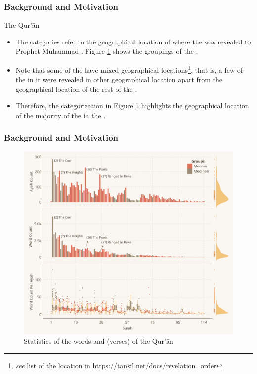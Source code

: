 \documentclass{beamer}
\theoremstyle{definition}
\begin{document}
\begin{frame}[t, fragile]\justifying
\frametitle{Background and Motivation}
\begin{block}{The Qur'\=an}
\begin{itemize}\justifying    
\item The categories refer to the geographical location of where the   was revealed to Prophet Muhammad . Figure \ref{fig:ayah_word_count} shows the groupings of the  . \pause
\item Note that some of the   have mixed geographical locations\footnote{\textit{see} list of the location in \url{https://tanzil.net/docs/revelation_order}}, that is, a few of the   in it were revealed in other geographical location apart from the geographical location of the rest of the  . \pause
\item Therefore, the categorization in Figure \ref{fig:ayah_word_count} highlights the geographical location of the majority of the   in the  .
\end{itemize}
\end{block}
\end{frame}
    
\begin{frame}[t, fragile]\justifying
\frametitle{Background and Motivation}
\begin{figure}[!b]
    \centering
    \includegraphics[height=0.7\textheight]{../img/plot1.pdf}
    \caption{Statistics of the words and   (verses) of the Qur'\=an}
    \label{fig:ayah_word_count}
\end{figure}
\end{frame}
\end{document}

